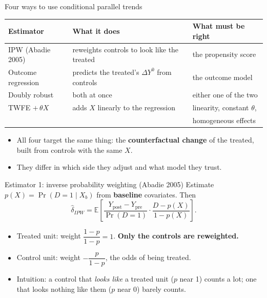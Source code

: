 \documentclass[
  11pt,
  ignorenonframetext,
  aspectratio=169,
]{beamer}
\providecommand{\tightlist}{%
  \setlength{\itemsep}{0pt}\setlength{\parskip}{0pt}}
\begin{document}
\begin{frame}{Four ways to use conditional parallel trends}
\protect{}\label{four-ways-to-use-conditional-parallel-trends}
\begin{center}\small
\begin{tabular}{lll}
\toprule
Estimator & What it does & What must be right \\
\midrule
IPW (Abadie 2005) & reweights controls to look like the treated & the propensity score \\
Outcome regression & predicts the treated's $\Delta Y^0$ from controls & the outcome model \\
Doubly robust & both at once & either one of the two \\
TWFE $+\,\theta X$ & adds $X$ linearly to the regression & linearity, constant $\theta$, \\
 & & homogeneous effects \\
\bottomrule
\end{tabular}
\end{center}

\begin{itemize}
\tightlist
\item
  All four target the same thing: the \textbf{counterfactual change} of
  the treated, built from controls with the same \(X\).
\item
  They differ in which side they adjust and what model they trust.
\end{itemize}
\end{frame}

\begin{frame}{Estimator 1: inverse probability weighting (Abadie 2005)}
\protect{}\label{estimator-1-inverse-probability-weighting-abadie-2005}
Estimate \(p(X) = \Pr(D=1 \mid X_b)\) from \textbf{baseline} covariates.
Then \[
\hat\delta_{IPW} = \mathbb{E}\!\left[\frac{Y_{\text{post}} - Y_{\text{pre}}}{\Pr(D=1)} \cdot \frac{D - p(X)}{1 - p(X)}\right].
\]

\begin{itemize}
\tightlist
\item
  Treated unit: weight \(\dfrac{1 - p}{1 - p} = 1\). \textbf{Only the
  controls are reweighted.}
\item
  Control unit: weight \(-\dfrac{p}{1-p}\), the odds of being treated.
\item
  Intuition: a control that \emph{looks like} a treated unit (\(p\) near
  1) counts a lot; one that looks nothing like them (\(p\) near 0)
  barely counts.
\end{itemize}
\end{frame}
\end{document}
